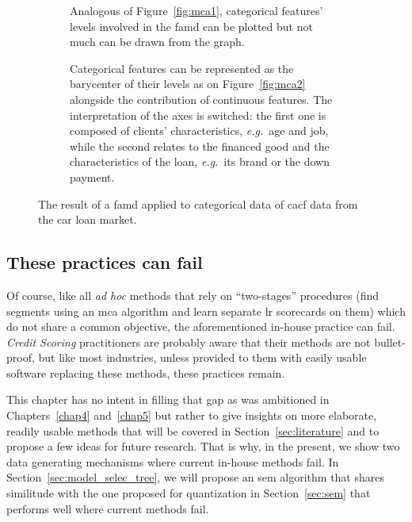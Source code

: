 \begin{figure}[!htb]
{\setlength{\parindent}{0cm}}

\begin{multicols}{2}
\centering
\begin{subfigure}[t]{0.45\textwidth}
\centering
\resizebox{\textwidth}{!}{}
\caption{\label{fig:famd1} Analogous of Figure~\ref{fig:mca1}, categorical features' levels involved in the \gls{famd} can be plotted but not much can be drawn from the graph.}
\end{subfigure}%
\columnbreak
\hspace*{1cm} \begin{subfigure}[t]{0.45\textwidth}
\centering
\resizebox{\textwidth}{!}{}
\caption{\label{fig:famd2} Categorical features can be represented as the barycenter of their levels as on Figure~\ref{fig:mca2} alongside the contribution of continuous features. The interpretation of the axes is switched: the first one is composed of clients' characteristics, \textit{e.g.}\ age and job, while the second relates to the financed good and the characteristics of the loan, \textit{e.g.}\ its brand or the down payment.}
\end{subfigure}
\end{multicols}

\caption{\label{fig:famd} The result of a \gls{famd} applied to categorical data of \gls{cacf} data from the car loan market.}
\end{figure}

\subsection{These practices can fail} \label{subsec:fail}

Of course, like all \textit{ad hoc} methods that rely on ``two-stages'' procedures (find segments using an \gls{mca} algorithm and learn separate \gls{lr} scorecards on them) which do not share a common objective, the aforementioned in-house practice can fail. \textit{Credit Scoring} practitioners are probably aware that their methods are not bullet-proof, but like most industries, unless provided to them with easily usable software replacing these methods, these practices remain.

This chapter has no intent in filling that gap as was ambitioned in Chapters~\ref{chap4} and~\ref{chap5} but rather to give insights on more elaborate, readily usable methods that will be covered in Section~\ref{sec:literature} and to propose a few ideas for future research. That is why, in the present, we show two data generating mechanisms where current in-house methods fail. In Section~\ref{sec:model_selec_tree}, we will propose an \gls{sem} algorithm that shares similitude with the one proposed for quantization in Section~\ref{sec:sem} that performs well where current methods fail.

